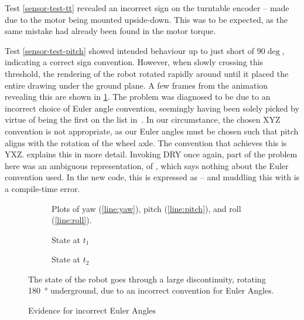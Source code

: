 \documentclass[main.tex]{subfiles}
\begin{document}
		Test \ref{sensor-test-tt} revealed an incorrect sign on the turntable encoder -- made due to the motor being mounted upside-down.
		This was to be expected, as the same mistake had already been found in the motor torque.

		Test \ref{sensor-test-pitch} showed intended behaviour up to just short of $90\deg$, indicating a correct sign convention.
		However, when slowly crossing this threshold, the rendering of the robot rotated rapidly around until it placed the entire drawing under the ground plane.
		A few frames from the animation revealing this are shown in \cref{fig:bad-euler}.
		The problem was diagnosed to be due to an incorrect choice of Euler angle convention, seemingly having been solely picked by virtue of being the first on the list in~\cite{diebel2006representing}.
		In our circumstance, the chosen XYZ convention is not appropriate, as our Euler angles must be chosen such that pitch aligns with the rotation of the wheel axle. The convention that achieves this is YXZ.
		 explains this in more detail.
		Invoking DRY once again, part of the problem here was an ambiguous representation, of , which says nothing about the Euler convention used.
		In the new code, this is expressed as  -- and muddling this with  is a compile-time error.

		\begin{figure}[b!]
			\centering
			\begin{subfigure}[t]{0.333\linewidth-2em}
				
				\caption{
					Plots of yaw (\ref{line:yaw}), pitch (\ref{line:pitch}), and roll (\ref{line:roll}).
				}
			\end{subfigure}\hfill
			\begin{subfigure}[t]{0.333\linewidth-2em}
				
				\caption{State at $t_1$}
			\end{subfigure}\hfill
			\begin{subfigure}[t]{0.333\linewidth-2em}
				
				\caption{State at $t_2$}
			\end{subfigure}
			\caption{Evidence for incorrect Euler Angles}
			\label{fig:bad-euler}
			\medskip
			\small
			The state of the robot goes through a large discontinuity, rotating \SI{180}{\degree} underground, due to an incorrect convention for Euler Angles.
		\end{figure}
\end{document}

